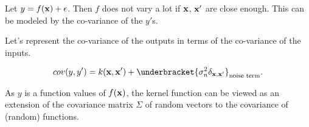 Let $y=f({\mathbf{x}})+\epsilon$. Then $f$ does not vary a lot if ${\mathbf{x}}$, ${\mathbf{x}}'$ are close enough. This can be modeled by the co-variance of the $y'$s.

Let's represent the co-variance of the outputs in terms of the co-variance of the inputs. 

$$cov(y,y') = k(\rvx, \rvx')+\underbracket{\sigma_n^2\delta_{\rvx,\rvx'}}_{\textrm{noise term}}.$$

As $y$ is a function values of $f({\mathbf{x}})$, the kernel function can be viewed as an extension of the covariance matrix $\Sigma$ of random vectors to the covariance of (random) functions. 






